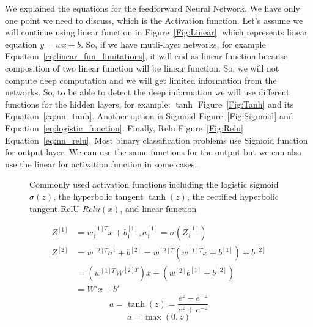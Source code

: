 We explained the equations for the feedforward Neural Network. We have only one point we need to discuss, which is the Activation function. Let's assume we will continue using linear function in Figure~\ref{Fig:Linear}, which represents linear equation  $y= w x + b$. So, if we have mutli-layer networks, for example Equation~\eqref{eq:linear_fun_limitations}, it will end as linear function because composition of two linear function will be linear function. So, we will not compute deep computation and we will get limited information from the networks. So, to be able to detect the deep information we will use different functions for the hidden layers, for example: $\tanh$ Figure~\ref{Fig:Tanh} and its Equation~\eqref{eq:nn_tanh}. Another option is Sigmoid Figure~\ref{Fig:Sigmoid} and  Equation~\eqref{eq:logistic_function}. Finally, Relu Figure~\ref{Fig:Relu} Equation~\eqref{eq:nn_relu}. Most binary classification problems use Sigmoid function for output layer. We can use the same functions for the output but we can also use the linear for activation function in some cases.%
\begin{figure}[!t]
 \centering
%
% 
%
 \caption{Commonly used activation functions including the logistic sigmoid $\sigma(z)$, the hyperbolic tangent $\tanh(z)$, the rectified hyperbolic tangent RelU $Relu(x)$, and linear function}
\end{figure}%
\begin{subequations}\label{eq:linear_fun_limitations}
  \begin{align}
   Z^{[1]} & = w_1^{[1]T} x + b_1^{[1]} , a_1^{[1]} = \sigma(Z_1^{[1]}) \\
   Z^{[2]} & = w^{[2]T} a^1 + b^{[2]} = w^{[2]T} (w^{[1]T}x + b^{[1]}) + b^{[2]}\\
   & = (w^{[1]T}W^{[2]T})x + (w^{[2]}b^{[1]}+ b^{[2]})\\
   & = W' x + b'
\end{align}
\end{subequations}%
\begin{equation}\label{eq:nn_tanh}
 a = \tanh(z) =\frac{e^z-e^{-z}}{e^z+e^{-z}}
\end{equation}%
\begin{equation}\label{eq:nn_relu}
 a = \max(0,z)
\end{equation}%
%
